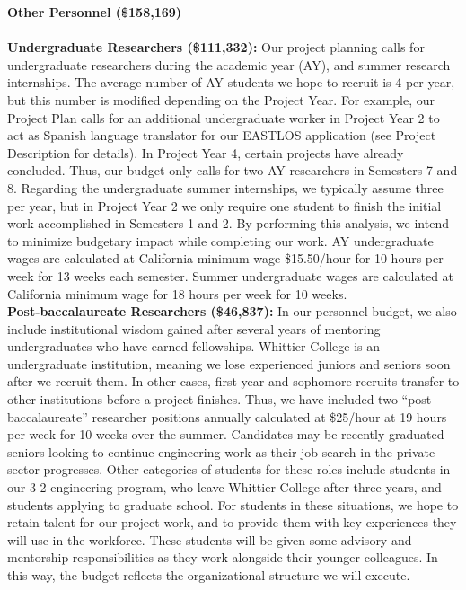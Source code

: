 \documentclass[11pt]{amsart}
\begin{document}
\noindent
\textbf{Other Personnel (\$158,169)} \\ \\
\textbf{Undergraduate Researchers (\$111,332):} Our project planning calls for undergraduate researchers during the academic year (AY), and summer research internships. The average number of AY students we hope to recruit is 4 per year, but this number is modified depending on the Project Year. For example, our Project Plan calls for an additional undergraduate worker in Project Year 2 to act as Spanish language translator for our EASTLOS application (see Project Description for details). In Project Year 4, certain projects have already concluded. Thus, our budget only calls for two AY researchers in Semesters 7 and 8. Regarding the undergraduate summer internships, we typically assume three per year, but in Project Year 2 we only require one student to finish the initial work accomplished in Semesters 1 and 2. By performing this analysis, we intend to minimize budgetary impact while completing our work. AY undergraduate wages are calculated at California minimum wage \$15.50/hour for 10 hours per week for 13 weeks each semester. Summer undergraduate wages are calculated at California minimum wage for 18 hours per week for 10 weeks. \\

\noindent
\textbf{Post-baccalaureate Researchers (\$46,837):} In our personnel budget, we also include institutional wisdom gained after several years of mentoring undergraduates who have earned fellowships. Whittier College is an undergraduate institution, meaning we lose experienced juniors and seniors soon after we recruit them. In other cases, first-year and sophomore recruits transfer to other institutions before a project finishes. Thus, we have included two “post-baccalaureate” researcher positions annually calculated at \$25/hour at 19 hours per week for 10 weeks over the summer. Candidates may be recently graduated seniors looking to continue engineering work as their job search in the private sector progresses. Other categories of students for these roles include students in our 3-2 engineering program, who leave Whittier College after three years, and students applying to graduate school. For students in these situations, we hope to retain talent for our project work, and to provide them with key experiences they will use in the workforce. These students will be given some advisory and mentorship responsibilities as they work alongside their younger colleagues. In this way, the budget reflects the organizational structure we will execute. \\
\end{document}
